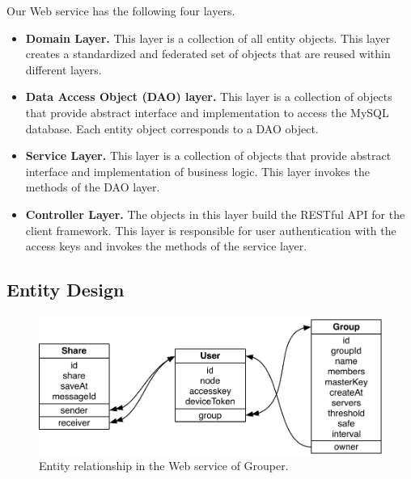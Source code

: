 \documentclass[a4paper,11pt]{report}
\begin{document}
Our Web service has the following four layers.

\begin{itemize}[leftmargin=7mm]
	\setlength{\itemsep}{1pt}
	\setlength{\parskip}{0pt}
	\setlength{\parsep}{0pt}
	\item 
	\textbf{Domain Layer.}
	This layer is a collection of all entity objects.
	This layer creates a standardized and federated set of objects that are reused within different layers.
	\item 
	\textbf{Data Access Object (DAO) layer.}
	This layer is a collection of objects that provide abstract interface and implementation to access the MySQL database. 
	Each entity object corresponds to a DAO object.
	\item 
	\textbf{Service Layer.}
	This layer is a collection of objects that provide abstract interface and implementation of business logic.
	This layer invokes the methods of the DAO layer.
	\item 
	\textbf{Controller Layer.}
	The objects in this layer build the RESTful API for the client framework.
	This layer is responsible for user authentication with the access keys and invokes the methods of the service layer.
\end{itemize}

\subsection{Entity Design}

\begin{figure}
	\centering
	\includegraphics[scale=0.75]{server_entities}
	\caption{Entity relationship in the Web service of Grouper.}
	\label{fig:server_entities}
\end{figure}
\end{document}
